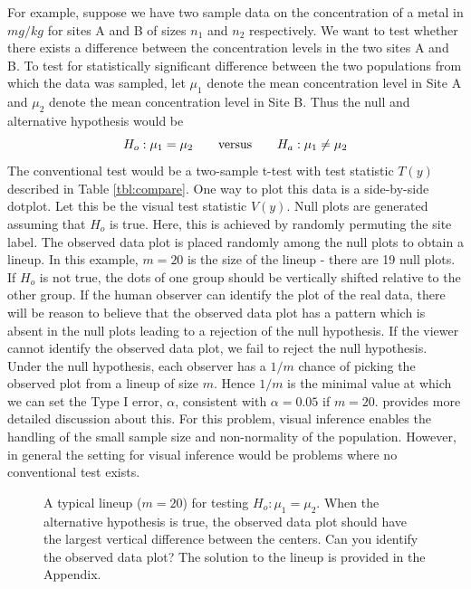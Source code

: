 For example, suppose we have two sample data on the concentration of a metal in $mg/kg$ for sites A and B of sizes $n_1$ and $n_2$ respectively. We want to test whether there exists a difference between the concentration levels in the two sites A and B. To test for statistically significant difference between the two populations from which the data was sampled, let $\mu_1$ denote the mean concentration level in Site A and $\mu_2$ denote the mean concentration level in Site B. Thus the null and alternative hypothesis would be
\[
H_o: \mu_1 = \mu_2 \qquad \hbox{versus} \qquad H_a: \mu_1 \ne \mu_2
\]
The conventional test would be a two-sample t-test with test statistic $T(y)$ described in Table \ref{tbl:compare}. One way to plot this data is a side-by-side dotplot. Let this be the visual test statistic $V(y)$. Null plots are generated assuming that $H_o$ is true. Here, this is achieved by randomly permuting the site label. The observed data plot is placed randomly among the null plots to obtain a lineup. In this example, $m = 20$ is the size of the lineup - there are 19 null plots. If $H_o$ is not true, the dots of one group should be vertically shifted relative to the other group. If the human observer can identify the plot of the real data, there will be reason to believe that the observed data plot has a pattern which is absent in the null plots leading to a rejection of the null hypothesis. If the viewer cannot identify the observed data plot, we fail to reject the null hypothesis. Under the null hypothesis, each observer has a $1/m$ chance of picking the observed plot from a lineup of size $m$. Hence $1/m$ is the minimal value at which we can set the Type I error, $\alpha$, consistent with $\alpha = 0.05$ if $m = 20$.  \cite{majumder:2013} provides more detailed discussion about this. For this problem, visual inference enables the handling of the small sample size and non-normality of the population. However, in general the setting for visual inference would be problems where no conventional test exists.
\begin{figure}[hbtp]
   \centering
      \caption{A typical lineup  ($m = 20$) for testing $H_o: \mu_1 =  \mu_2$. 
      When the alternative hypothesis is true, the observed data plot should have the largest vertical difference between the centers. Can you identify the observed data plot? The solution to the lineup is provided in the Appendix.}
      \label{lineup}
\end{figure}

